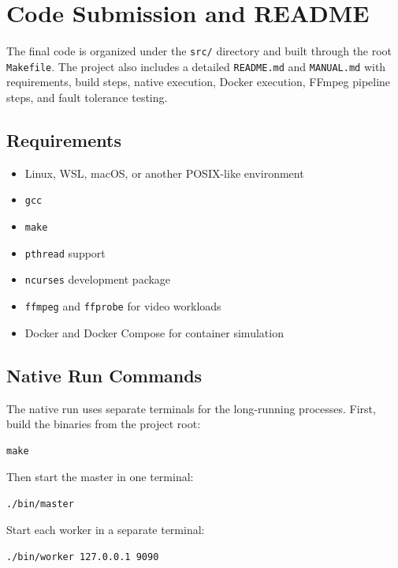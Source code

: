 \documentclass[12pt,a4paper]{article}
\begin{document}
\section{Code Submission and README}

The final code is organized under the \texttt{src/} directory and built through the root \texttt{Makefile}. The project also includes a detailed \texttt{README.md} and \texttt{MANUAL.md} with requirements, build steps, native execution, Docker execution, FFmpeg pipeline steps, and fault tolerance testing.

\subsection{Requirements}

\begin{itemize}[noitemsep]
    \item Linux, WSL, macOS, or another POSIX-like environment
    \item \texttt{gcc}
    \item \texttt{make}
    \item \texttt{pthread} support
    \item \texttt{ncurses} development package
    \item \texttt{ffmpeg} and \texttt{ffprobe} for video workloads
    \item Docker and Docker Compose for container simulation
\end{itemize}

\subsection{Native Run Commands}

The native run uses separate terminals for the long-running processes. First, build the binaries from the project root:

\begin{lstlisting}[style=shellstyle]
make
\end{lstlisting}

Then start the master in one terminal:

\begin{lstlisting}[style=shellstyle]
./bin/master
\end{lstlisting}

Start each worker in a separate terminal:

\begin{lstlisting}[style=shellstyle]
./bin/worker 127.0.0.1 9090
\end{lstlisting}
\end{document}
